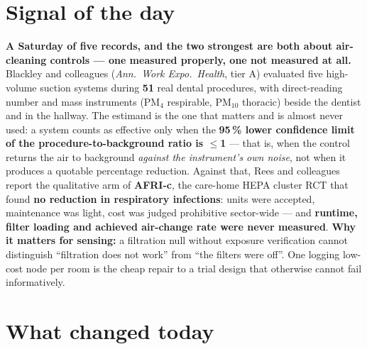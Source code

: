\documentclass[10pt]{article}
\begin{document}
\vspace{6mm}

\section*{\sffamily\bfseries\color{Deep}Signal of the day}
\vspace{-1.5mm}{\color{Amber}\rule{\linewidth}{1.1pt}}\vspace{2.5mm}

\begin{keybox}
{\sffamily\bfseries\small\color{Deep}A Saturday of five records, and the two strongest are both
about air-cleaning controls --- one measured properly, one not measured at all.}\\[1.4mm]
\footnotesize
Blackley and colleagues (\textit{Ann.\ Work Expo.\ Health}, tier A) evaluated five high-volume suction
systems during \textbf{51} real dental procedures, with direct-reading number and mass instruments (PM$_4$
respirable, PM$_{10}$ thoracic) beside the dentist and in the hallway. The estimand is the one that matters
and is almost never used: a system counts as effective only when the \textbf{95\,\% lower confidence limit
of the procedure-to-background ratio is $\le$1} --- that is, when the control returns the air to background
\textit{against the instrument's own noise}, not when it produces a quotable percentage reduction.
Against that, Rees and colleagues report the qualitative arm of \textbf{AFRI-c}, the care-home HEPA cluster
RCT that found \textbf{no reduction in respiratory infections}: units were accepted, maintenance was light,
cost was judged prohibitive sector-wide --- and \textbf{runtime, filter loading and achieved air-change
rate were never measured}. \textbf{Why it matters for sensing:} a filtration null without exposure
verification cannot distinguish ``filtration does not work'' from ``the filters were off''. One logging
low-cost node per room is the cheap repair to a trial design that otherwise cannot fail informatively.\par
\end{keybox}

\vspace{3mm}

\section*{\sffamily\bfseries\color{Deep}What changed today}
\vspace{-1.5mm}{\color{Amber}\rule{\linewidth}{1.1pt}}\vspace{2.5mm}
\end{document}

